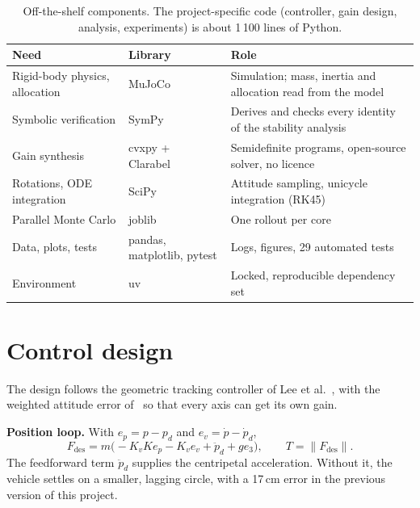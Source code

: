\documentclass[10pt,a4paper]{scrartcl}
\newcommand{\RuleSection}[1]{%
    \section{#1}%
    \vspace{0.2em}{\color{accent!35}\hrule height 0.4pt}\vspace{0.3em}%
  }
\begin{document}
  \begin{table}[h]
  \small
  \centering
  \renewcommand{\arraystretch}{1.1}
  \begin{tabularx}{\textwidth}{@{}L{4.2cm} L{3.4cm} X@{}}
  \toprule
  \textbf{Need} & \textbf{Library} & \textbf{Role} \\[.15cm]
  \midrule
  Rigid-body physics, allocation & MuJoCo & Simulation; mass, inertia and allocation read from the model \\[.15cm]
  Symbolic verification & SymPy & Derives and checks every identity of the stability analysis \\[.15cm]
  Gain synthesis & cvxpy + Clarabel~\citep{diamond2016cvxpy} & Semidefinite programs, open-source solver, no licence \\[.15cm]
  Rotations, ODE integration & SciPy & Attitude sampling, unicycle integration (RK45) \\[.15cm]
  Parallel Monte Carlo & joblib & One rollout per core \\[.15cm]
  Data, plots, tests & pandas, matplotlib, pytest & Logs, figures, 29 automated tests \\[.15cm]
  Environment & uv & Locked, reproducible dependency set \\[.15cm]
  \bottomrule
  \end{tabularx}
  \caption{Off-the-shelf components. The project-specific code (controller, gain design, analysis, experiments) is about 1\,100 lines of Python.}
  \label{tab:stack}
  \end{table}

  \RuleSection{Control design}
  \label{sec:control}

  The design follows the geometric tracking controller of Lee et
  al.~\citep{lee2010geometric}, with the weighted attitude error of~\citep{lee2012exponential}
  so that every axis can get its own gain.

  \textbf{Position loop.} With $e_p = p - p_d$ and $e_v = \dot p - \dot p_d$,
  \begin{equation}
    F_{\mathrm{des}} = m\bigl(-K_v K e_p - K_v e_v + \ddot p_d + g e_3\bigr), \qquad T = \|F_{\mathrm{des}}\|.
  \end{equation}
  The feedforward term $\ddot p_d$ supplies the centripetal acceleration. Without it, the vehicle
  settles on a smaller, lagging circle, with a 17\,cm error in the previous version of this project.
\end{document}
